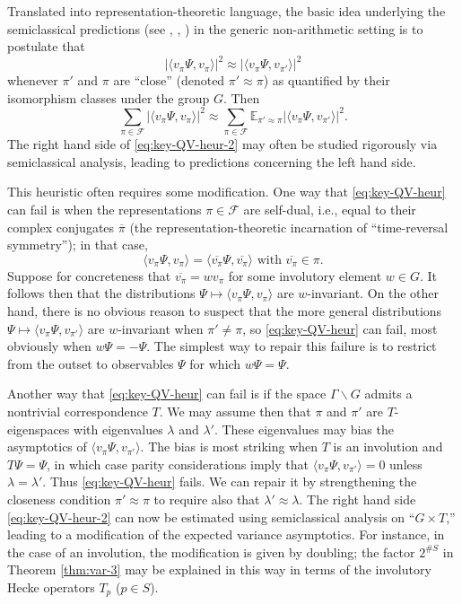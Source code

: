 \documentclass[reqno,10pt]{amsart}
\theoremstyle{plain} %
\theoremstyle{definition}
\theoremstyle{plain} %
\theoremstyle{remark}
\theoremstyle{itplain} %
\theoremstyle{remark} %
\numberwithin{equation}{section}
\begin{document}
Translated into representation-theoretic language, the basic idea underlying the semiclassical predictions (see \cite{MR848319}, \cite[\S15.6]{2009arXiv0911.4312Z}, \cite[\S4.1.3]{MR3204186}) in the generic non-arithmetic setting is to postulate that
\begin{equation}\label{eq:key-QV-heur}
  |\langle v_\pi \Psi, v_\pi \rangle|^2 \approx
  |\langle v_\pi \Psi, v_{\pi'} \rangle|^2
\end{equation}
whenever $\pi'$ and $\pi$ are ``close'' (denoted $\pi ' \approx \pi$) as quantified by their isomorphism classes under the group $G$.  Then
\begin{equation}\label{eq:key-QV-heur-2}
  \sum_{\pi \in \mathcal{F}} |\langle v_\pi \Psi, v_\pi
  \rangle|^2
  \approx 
  \sum_{\pi \in \mathcal{F}} \mathbb{E}_{\pi ' \approx \pi } |\langle v_\pi \Psi,
  v_{\pi'} \rangle|^2.
\end{equation}
The right hand side of \eqref{eq:key-QV-heur-2} may often be studied rigorously via semiclassical analysis, leading to predictions concerning the left hand side.

This heuristic often requires some modification.  One way that \eqref{eq:key-QV-heur} can fail is when the representations $\pi \in \mathcal{F}$ are self-dual, i.e., equal to their complex conjugates $\overline{\pi}$ (the representation-theoretic incarnation of ``time-reversal symmetry''); in that case,
\[\langle v_\pi \Psi, v_\pi \rangle = \langle \overline{v_\pi }
  \Psi, \overline{v_\pi } \rangle \text{ with } \overline{v_\pi } \in \pi.
\]
Suppose for concreteness that $\overline{v_\pi} = w v_\pi$ for some involutory element $w \in G$.  It follows then that the distributions $\Psi \mapsto \langle v_\pi \Psi, v_\pi \rangle$ are $w$-invariant.  On the other hand, there is no obvious reason to suspect that the more general distributions $\Psi \mapsto \langle v_\pi \Psi, v_{\pi'} \rangle$ are $w$-invariant when $\pi ' \neq \pi$, so \eqref{eq:key-QV-heur} can fail, most obviously when $w \Psi = - \Psi$.  The simplest way to repair this failure is to restrict from the outset to observables $\Psi$ for which $w \Psi = \Psi$.

Another way that \eqref{eq:key-QV-heur} can fail is if the space $\Gamma \backslash G$ admits a nontrivial correspondence $T$.  We may assume then that $\pi$ and $\pi '$ are $T$-eigenspaces with eigenvalues $\lambda$ and $\lambda '$.  These eigenvalues may bias the asymptotics of $\langle v_\pi \Psi, v_{\pi '} \rangle$.  The bias is most striking when $T$ is an involution and $T \Psi = \Psi$, in which case parity considerations imply that $\langle v_\pi \Psi, v_{\pi '} \rangle = 0$ unless $\lambda = \lambda '$.  Thus \eqref{eq:key-QV-heur} fails.  We can repair it by strengthening the closeness condition $\pi ' \approx \pi$ to require also that $\lambda ' \approx \lambda$.  The right hand side \eqref{eq:key-QV-heur-2} can now be estimated using semiclassical analysis on ``$G \times T$,'' leading to a modification of the expected variance asymptotics.  For instance, in the case of an involution, the modification is given by doubling; the factor $2^{\# S}$ in Theorem \ref{thm:var-3} may be explained in this way in terms of the involutory Hecke operators $T_p$ ($p \in S$).
\end{document}

